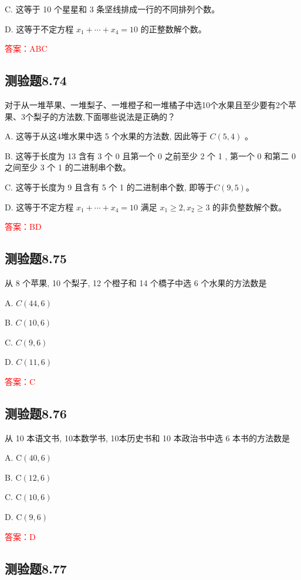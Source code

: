 \documentclass[UTF8, heading=true]{ctexart}
\begin{document}
C. 这等于 10 个星星和 3 条坚线排成一行的不同排列个数。

D. 这等于不定方程 $x_1+\cdots+x_4=10$ 的正整数解个数。

\textcolor{red}{答案：ABC}

\subsection{测验题8.74}

对于从一堆苹果、一堆梨子、一堆橙子和一堆橘子中选10个水果且至少要有2个苹果、3个梨子的方法数,下面哪些说法是正确的？

A. 这等于从这4堆水果中选 5 个水果的方法数, 因此等于 $C(5,4)$ 。

B. 这等于长度为 13 含有 3 个 0 且第一个 0 之前至少 2 个 1 , 第一个 0 和第二 0 之间至少 3 个 1 的二进制串个数。

C. 这等于长度为 9 且含有 5 个 1 的二进制串个数, 即等于$C(9,5)$。

D. 这等于不定方程 $x_1+\cdots+x_4=10$ 满足 $x_1 \geq 2, x_2 \geq 3$ 的非负整数解个数。

\textcolor{red}{答案：BD}

\subsection{测验题8.75}

从 8 个苹果, 10 个梨子, 12 个橙子和 14 个橋子中选 6 个水果的方法数是

A. $ C(44,6)$

B. $ C(10,6)$

C. $ C(9,6)$

D. $ C(11,6)$

\textcolor{red}{答案：C}


\subsection{测验题8.76}

从 10 本语文书, 10本数学书, 10本历史书和 10 本政治书中选 6 本书的方法数是

A. $\mathrm{C}(40,6)$

B. $\mathrm{C}(12,6)$

C. $\mathrm{C}(10,6)$

D. $\mathrm{C}(9,6)$

\textcolor{red}{答案：D}

\subsection{测验题8.77}
\end{document}
